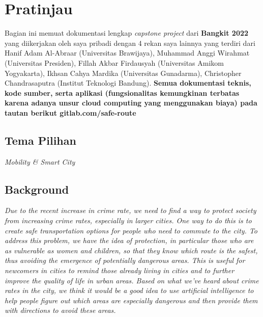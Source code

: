 {
\section*{Pratinjau}

Bagian ini memuat dokumentasi lengkap \textit{capstone project} dari \textbf{Bangkit 2022} yang diikerjakan oleh saya pribadi dengan 4 rekan saya lainnya yang terdiri dari Hanif Adam Al-Abraar (Universitas Brawijaya), Muhammad Anggi Wirahmat (Universitas Presiden), Fillah Akbar Firdausyah (Universitas Amikom Yogyakarta), Ikhsan Cahya Mardika (Universitas Gunadarma), Christopher Chandrasaputra (Institut Teknologi Bandung). \textbf{Semua dokumentasi teknis, kode sumber, serta aplikasi (fungsionalitas kemungkinan terbatas karena adanya unsur cloud computing yang menggunakan biaya) pada tautan berikut gitlab.com/safe-route}

\subsection*{Tema Pilihan}
\textit{Mobility \& Smart City}

\subsection*{Background}
\textit{Due to the recent increase in crime rate, we need to find a way to protect society from increasing crime rates, especially in larger cities. One way to do this is to create safe transportation options for people who need to commute to the city. To address this problem, we have the idea of protection, in particular those who are as vulnerable as women and children, so that they know which route is the safest, thus avoiding the emergence of potentially dangerous areas. This is useful for newcomers in cities to remind those already living in cities and to further improve the quality of life in urban areas. Based on what we've heard about crime rates in the city, we think it would be a good idea to use artificial intelligence to help people figure out which areas are especially dangerous and then provide them with directions to avoid these areas.
}

}
